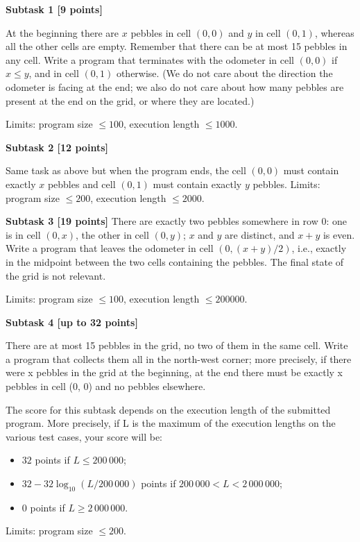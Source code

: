 {\bf Subtask 1 [9 points] }

At the beginning there are $x$ pebbles in cell $(0, 0)$ and $y$ in cell $(0, 1)$, whereas all the other cells are empty. Remember that there can be at most 15 pebbles in any cell. Write a program that terminates with the odometer in cell $(0, 0)$ if $x \le y$, and in cell $(0, 1)$ otherwise. (We do not care about the direction the odometer is facing at the end; we also do not care about how many pebbles are present at the end on the grid, or where they are located.)

Limits: program size $\le 100$, execution length $\le 1 000$.

{\bf Subtask 2 [12 points] }

Same task as above but when the program ends, the cell $(0, 0)$ must contain exactly $x$ pebbles and cell $(0, 1)$ must contain exactly $y$ pebbles.
Limits: program size $\le 200$, execution length $\le 2 000$.

{\bf Subtask 3 [19 points] }
There are exactly two pebbles somewhere in row 0: one is in cell $(0, x)$, the other in cell $(0, y)$; $x$ and $y$ are distinct, and $x + y$ is even. Write a program that leaves the odometer in cell $(0, (x + y) / 2)$, i.e., exactly in the midpoint between the two cells containing the pebbles. The final state of the grid is not relevant.

Limits: program size $\le 100$, execution length $\le 200 000$.

{\bf Subtask 4 [up to 32 points]}

There are at most 15 pebbles in the grid, no two of them in the same cell. Write a program that collects them all in the north-west corner; more precisely, if there were x pebbles in the grid at the beginning, at the end there must be exactly x pebbles in cell (0, 0) and no pebbles elsewhere. 

The score for this subtask depends on the execution length of the submitted program. More
precisely, if L is the maximum of the execution lengths on the various test cases, your score will be:
\begin{itemize}
\item $32$ points if $L \le 200\,000$;
\item $32 - 32 \log_{10} (L / 200\,000)$ points if $200\,000 < L < 2\,000\,000$;
\item $0$ points if $L \ge 2\,000\,000$.
\end{itemize}

Limits: program size $\le 200$.


